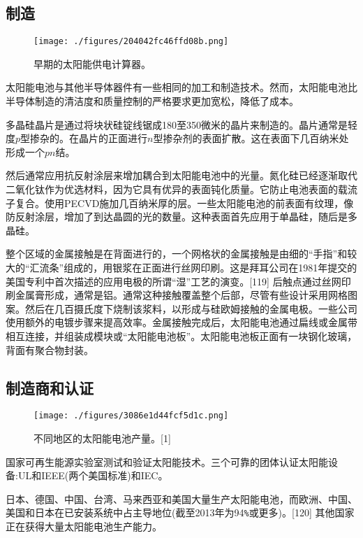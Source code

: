 \subsection{制造}

\begin{figure}[ht]
\centering
\texttt{[image: ./figures/204042fc46ffd08b.png]}
\caption{早期的太阳能供电计算器。} \label{fig_TYNDC_3}
\end{figure}

太阳能电池与其他半导体器件有一些相同的加工和制造技术。然而，太阳能电池比半导体制造的清洁度和质量控制的严格要求更加宽松，降低了成本。

多晶硅晶片是通过将块状硅锭线锯成180至350微米的晶片来制造的。晶片通常是轻度$p$型掺杂的。在晶片的正面进行$n$型掺杂剂的表面扩散。这在表面下几百纳米处形成一个$pn$结。

然后通常应用抗反射涂层来增加耦合到太阳能电池中的光量。氮化硅已经逐渐取代二氧化钛作为优选材料，因为它具有优异的表面钝化质量。它防止电池表面的载流子复合。使用PECVD施加几百纳米厚的层。一些太阳能电池的前表面有纹理，像防反射涂层，增加了到达晶圆的光的数量。这种表面首先应用于单晶硅，随后是多晶硅。

整个区域的金属接触是在背面进行的，一个网格状的金属接触是由细的“手指”和较大的“汇流条”组成的，用银浆在正面进行丝网印刷。这是拜耳公司在1981年提交的美国专利中首次描述的应用电极的所谓“湿”工艺的演变。[119] 后触点通过丝网印刷金属膏形成，通常是铝。通常这种接触覆盖整个后部，尽管有些设计采用网格图案。然后在几百摄氏度下烧制该浆料，以形成与硅欧姆接触的金属电极。一些公司使用额外的电镀步骤来提高效率。金属接触完成后，太阳能电池通过扁线或金属带相互连接，并组装成模块或“太阳能电池板”。太阳能电池板正面有一块钢化玻璃，背面有聚合物封装。

\subsection{制造商和认证}

\begin{figure}[ht]
\centering
\texttt{[image: ./figures/3086e1d44fcf5d1c.png]}
\caption{不同地区的太阳能电池产量。[1]} \label{fig_TYNDC_2}
\end{figure}

国家可再生能源实验室测试和验证太阳能技术。三个可靠的团体认证太阳能设备:UL和IEEE(两个美国标准)和IEC。

日本、德国、中国、台湾、马来西亚和美国大量生产太阳能电池，而欧洲、中国、美国和日本在已安装系统中占主导地位(截至2013年为94\verb`%`或更多)。[120] 其他国家正在获得大量太阳能电池生产能力。

